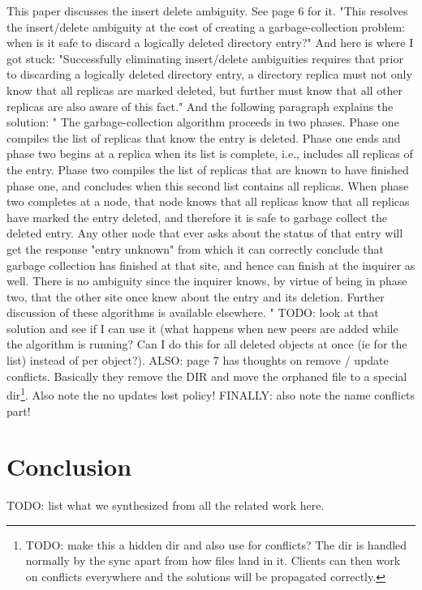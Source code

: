 This paper discusses the insert delete ambiguity.
See page 6 for it.
"This resolves the insert/delete ambiguity at the cost of creating a garbage-collection problem: when is it safe to discard a logically deleted directory entry?"
And here is where I got stuck: "Successfully eliminating insert/delete ambiguities requires that prior to discarding a logically deleted directory entry, a directory replica must not only know that all replicas are marked deleted, but further must know that all other replicas are also aware of this fact."
And the following paragraph explains the solution: "
The garbage-collection algorithm proceeds in two phases.
Phase one compiles the list of replicas that know the entry is deleted.
Phase one ends and phase two begins at a replica when its list is complete, i.e., includes all replicas of the entry.
Phase two compiles the list of replicas that are known to have finished phase one, and concludes when this second list contains all replicas.
When phase two completes at a node, that node knows that all replicas know that all replicas have marked the entry deleted, and therefore it is safe to garbage collect the deleted entry.
Any other node that ever asks about the status of that entry will get the response "entry unknown" from which it can correctly conclude that garbage collection has finished at that site, and hence can finish at the inquirer as well.
There is no ambiguity since the inquirer knows, by virtue of being in phase two, that the other site once knew about the entry and its deletion.
Further discussion of these algorithms is available elsewhere.
"
TODO: look at that solution and see if I can use it (what happens when new peers are added while the algorithm is running? Can I do this for all deleted objects at once (ie for the list) instead of per object?).
ALSO: page 7 has thoughts on remove / update conflicts.
Basically they remove the DIR and move the orphaned file to a special dir\footnote{TODO: make this a hidden dir and also use for conflicts? The dir is handled normally by the sync apart from how files land in it. Clients can then work on conflicts everywhere and the solutions will be propagated correctly.}.
Also note the no updates lost policy!
FINALLY: also note the name conflicts part!

\section{Conclusion}
\label{sec:Conclusion}


TODO: list what we synthesized from all the related work here.

